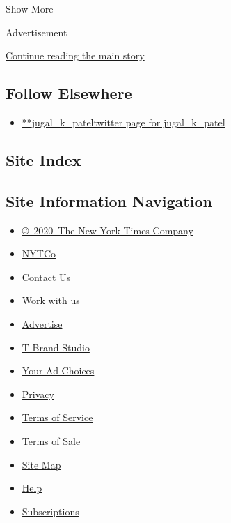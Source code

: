 Show More

Advertisement

\protect\hyperlink{after-mid2}{Continue reading the main story}

\hypertarget{follow-elsewhere}{%
\subsection{Follow Elsewhere}\label{follow-elsewhere}}

\begin{itemize}
\tightlist
\item
  \href{https://twitter.com/jugal_k_patel}{**jugal\_k\_pateltwitter page
  for jugal\_k\_patel}
\end{itemize}

\hypertarget{site-index}{%
\subsection{Site Index}\label{site-index}}

\hypertarget{site-information-navigation}{%
\subsection{Site Information
Navigation}\label{site-information-navigation}}

\begin{itemize}
\tightlist
\item
  \href{https://help.nytimes.com/hc/en-us/articles/115014792127-Copyright-notice}{©~2020~The
  New York Times Company}
\end{itemize}

\begin{itemize}
\tightlist
\item
  \href{https://www.nytco.com/}{NYTCo}
\item
  \href{https://help.nytimes.com/hc/en-us/articles/115015385887-Contact-Us}{Contact
  Us}
\item
  \href{https://www.nytco.com/careers/}{Work with us}
\item
  \href{https://nytmediakit.com/}{Advertise}
\item
  \href{http://www.tbrandstudio.com/}{T Brand Studio}
\item
  \href{https://www.nytimes.com/privacy/cookie-policy\#how-do-i-manage-trackers}{Your
  Ad Choices}
\item
  \href{https://www.nytimes.com/privacy}{Privacy}
\item
  \href{https://help.nytimes.com/hc/en-us/articles/115014893428-Terms-of-service}{Terms
  of Service}
\item
  \href{https://help.nytimes.com/hc/en-us/articles/115014893968-Terms-of-sale}{Terms
  of Sale}
\item
  \href{https://spiderbites.nytimes.com}{Site Map}
\item
  \href{https://help.nytimes.com/hc/en-us}{Help}
\item
  \href{https://www.nytimes.com/subscription?campaignId=37WXW}{Subscriptions}
\end{itemize}
